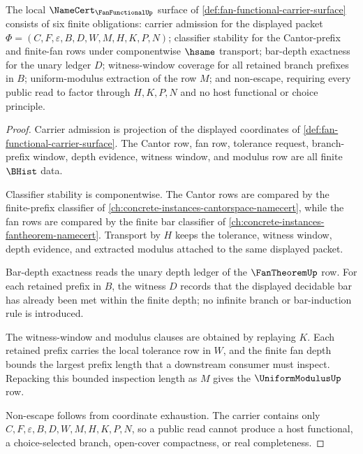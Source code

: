 \begin{theorem}
\label{thm:fan-functional-namecert-obligations}
The local $\NameCert_{\FanFunctionalUp}$ surface of
\autoref{def:fan-functional-carrier-surface} consists of six finite
obligations: carrier admission for the displayed packet
$\Phi=(C,F,\varepsilon,B,D,W,M,H,K,P,N)$; classifier stability for the
Cantor-prefix and finite-fan rows under componentwise $\hsame$ transport;
bar-depth exactness for the unary ledger $D$; witness-window coverage for all
retained branch prefixes in $B$; uniform-modulus extraction of the row $M$; and
non-escape, requiring every public read to factor through $H,K,P,N$ and no
host functional or choice principle.
\end{theorem}
\begin{proof}
Carrier admission is projection of the displayed coordinates of
\autoref{def:fan-functional-carrier-surface}. The Cantor row, fan row,
tolerance request, branch-prefix window, depth evidence, witness window, and
modulus row are all finite $\BHist$ data.

Classifier stability is componentwise. The Cantor rows are compared by the
finite-prefix classifier of
\autoref{ch:concrete-instances-cantorspace-namecert}, while the fan rows are
compared by the finite bar classifier of
\autoref{ch:concrete-instances-fantheorem-namecert}. Transport by $H$ keeps
the tolerance, witness window, depth evidence, and extracted modulus attached
to the same displayed packet.

Bar-depth exactness reads the unary depth ledger of the $\FanTheoremUp$ row.
For each retained prefix in $B$, the witness $D$ records that the displayed
decidable bar has already been met within the finite depth; no infinite branch
or bar-induction rule is introduced.

The witness-window and modulus clauses are obtained by replaying $K$. Each
retained prefix carries the local tolerance row in $W$, and the finite fan
depth bounds the largest prefix length that a downstream consumer must inspect.
Repacking this bounded inspection length as $M$ gives the
$\UniformModulusUp$ row.

Non-escape follows from coordinate exhaustion. The carrier contains only
$C,F,\varepsilon,B,D,W,M,H,K,P,N$, so a public read cannot produce a host
functional, a choice-selected branch, open-cover compactness, or real
completeness.
\end{proof}

